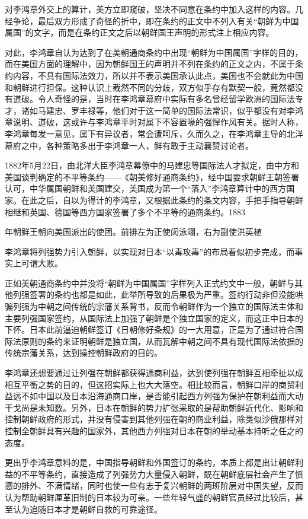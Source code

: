 \documentclass[12pt,UTF8]{ctexbook}
\begin{document}
对李鸿章外交上的算计，美方立即窥破，坚决不同意在条约中加入这样的内容。几经争论，最后双方形成了奇怪的折中，即在条约的正文中不列入有关“朝鲜为中国属国”的文字，而是在条约正文之后以朝鲜国王声明的形式注上相应内容。

对此，李鸿章自认为达到了在美朝通商条约中出现“朝鲜为中国属国”字样的目的，而在美国方面的理解中，因为朝鲜国王的声明并不列在条约的正文之内，不属于条约内容，不具有国际法效力，所以并不表示美国承认此点，美国也不会就此为中国和朝鲜进行担保。这种认识上截然不同的分歧，双方似乎存有默契一般，竟然都没有道破。令人奇怪的是，当时在李鸿章幕府中实际有多名曾经留学欧洲的国际法专才，诸如马建忠、罗丰禄等，他们对于这一简单的国际法常识，似乎都没有对李鸿章说明、道破，这或许与李鸿章平时对属下不容置喙的强悍作风有关。据时人称，李鸿章每发一意见，属下有异议者，常会遭呵斥，久而久之，在李鸿章主导的北洋幕府之中，各种策略多出于李鸿章一人，鲜有敢于主动襄赞讨论者。

1882年5月22日，由北洋大臣李鸿章幕僚中的马建忠等国际法人才拟定，由中方和美国谈判确定的不平等条约——《朝美修好通商条约》，经中国要求朝鲜王朝签署认可，中华属国朝鲜和美国建交，美国成为第一个“落入”李鸿章算计中的西方国家。在此之后，自以为得计的李鸿章，又根据此条约的条文内容，手把手指导朝鲜相继和英国、德国等西方国家签署了多个不平等的通商条约。1883


年朝鲜王朝向美国派出的使团。前排左为正使闵泳翊，右为副使洪英植

李鸿章将列强势力引入朝鲜，以实现对日本“以毒攻毒”的布局看似初步完成，而事实上可谓大败。

正如美朝通商条约中并没将“朝鲜为中国属国”字样列入正式约文中一般，朝鲜与其他列强签署的条约也都是如此，此举所导致的后果极为严重。签约行动非但没能哄骗列强为中朝之间传统的宗藩关系背书，反而令朝鲜作为一个独立的国际法主体和主要列强国家签约，从国际法上加强了朝鲜是个独立国家的定义，而这正中日本的下怀。日本此前逼迫朝鲜签订《日朝修好条规》的一大用意，正是为了通过符合国际法原则的条约来证明朝鲜是独立国，从而瓦解中朝之间不具有现代国际法依据的传统宗藩关系，达到操控朝鲜政府的目的。

李鸿章还想要通过让列强在朝鲜都获得通商利益，达到使列强在朝鲜互相牵扯以成相互平衡之势的目的，但这招实际上也大大落空。相比较而言，朝鲜口岸的商贸利益远不如中国以及日本沿海通商口岸，是否能引起西方列强为保护在朝利益而大动干戈尚是未知数。另外，日本在朝鲜的势力扩张采取的是帮助朝鲜近代化、影响和控制朝鲜政府的形式，并没有侵害到其他列强在朝的商业利益，除类似沙俄那样对控制全朝鲜具有兴趣的国家外，其他西方列强对日本在朝的举动基本持听之任之的态度。

更出乎李鸿章意料的是，中国指导朝鲜和外国签订的条约，本质上都是出让朝鲜利益的不平等条约，直接造成了列强势力大量侵入朝鲜，既在朝鲜底层社会产生了愤懑的排外、不满情绪，同时也使一些有志于复兴朝鲜的两班阶层对中国失望，反而认为帮助朝鲜厘革旧制的日本较为可亲。一些年轻气盛的朝鲜官员经过比较后，甚至认为追随日本才是朝鲜自救的可靠途径。
\end{document}
